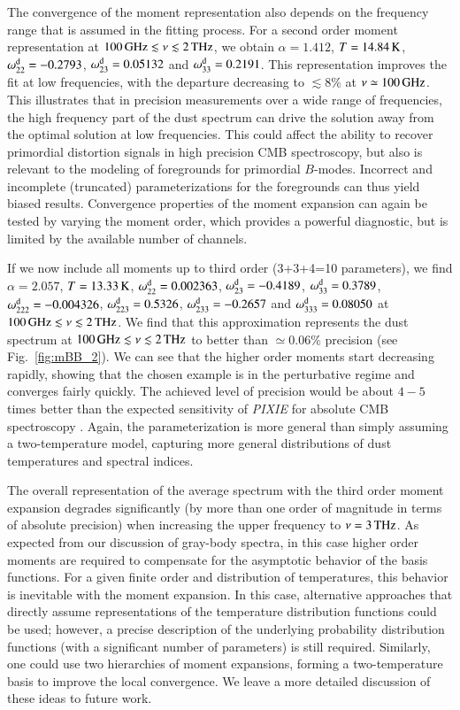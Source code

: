 \documentclass[usenatbib]{mn2e}
\begin{document}
The convergence of the moment representation also depends on the frequency range that is assumed in the fitting process. For a second order moment representation at $100\,{\rm GHz}\lesssim \nu\lesssim 2\,{\rm THz}$, we obtain $\alpha=1.412$, $T=14.84\,{\rm K}$, $\omega^{\rm d}_{22}=-0.2793$, $\omega^{\rm d}_{23}=0.05132$ and $\omega^{\rm d}_{33}=0.2191$. This representation improves the fit at low frequencies, with the departure decreasing to $\lesssim 8\%$ at $\nu\simeq 100\,{\rm GHz}$. This illustrates that in precision measurements over a wide range of frequencies, the high frequency part of the dust spectrum can drive the solution away from the optimal solution at low frequencies. This could affect the ability to recover primordial distortion signals in high precision CMB spectroscopy, but also is relevant to the modeling of foregrounds for primordial $B$-modes. Incorrect and incomplete (truncated) parameterizations for the foregrounds can thus yield biased results. Convergence properties of the moment expansion can again be tested by varying the moment order, which provides a powerful diagnostic, but is limited by the available number of channels.


If we now include all moments up to third order (3+3+4=10 parameters), we find $\alpha=2.057$, $T=13.33\,{\rm K}$, $\omega^{\rm d}_{22}=0.002363$, $\omega^{\rm d}_{23}=-0.4189$, $\omega^{\rm d}_{33}=0.3789$, $\omega^{\rm d}_{222}=-0.004326$, $\omega^{\rm d}_{223}=0.5326$, $\omega^{\rm d}_{233}=-0.2657$ and $\omega^{\rm d}_{333}=0.08050$ at $100\,{\rm GHz}\lesssim \nu\lesssim 2\,{\rm THz}$. We find that this approximation represents the dust spectrum at $100\,{\rm GHz}\lesssim \nu\lesssim 2\,{\rm THz}$ to better than $\simeq 0.06\%$ precision (see Fig.~\ref{fig:mBB_2}). We can see that the higher order moments start decreasing rapidly, showing that the chosen example is in the perturbative regime and converges fairly quickly. The achieved level of precision would be about $4-5$ times better than the expected sensitivity of {\it PIXIE} for absolute CMB spectroscopy \citep[$\Delta I_\nu\simeq 5\,{\rm Jy/sr}$;][]{Kogut2011}. Again, the parameterization is more general than simply assuming a two-temperature model, capturing more general distributions of dust temperatures and spectral indices. 

The overall representation of the average spectrum with the third order moment expansion degrades significantly (by more than one order of magnitude in terms of absolute precision) when increasing the upper frequency to $\nu=3\,{\rm THz}$. As expected from our discussion of gray-body spectra, in this case higher order moments are required to compensate for the asymptotic behavior of the basis functions. For a given finite order and distribution of temperatures, this behavior is inevitable with the moment expansion. In this case, alternative approaches that directly assume representations of the temperature distribution functions could be used; however, a precise description of the underlying probability distribution functions (with a significant number of parameters) is still required. Similarly, one could use two hierarchies of moment expansions, forming a two-temperature basis to improve the local convergence. We leave a more detailed discussion of these ideas to future work.
\end{document}
